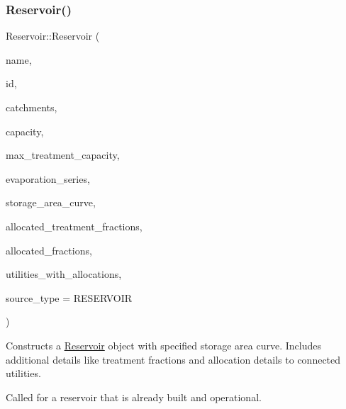 \subsubsection{\texorpdfstring{Reservoir()}{Reservoir()}\hspace{0.1cm}{\footnotesize\ttfamily [5/9]}}
{\footnotesize\ttfamily Reservoir\+::\+Reservoir (\begin{DoxyParamCaption}\item[{const char $\ast$}]{name,  }\item[{const int}]{id,  }\item[{const vector$<$ \mbox{\hyperlink{classCatchment}{Catchment}} $\ast$$>$ \&}]{catchments,  }\item[{const double}]{capacity,  }\item[{const double}]{max\+\_\+treatment\+\_\+capacity,  }\item[{Evaporation\+Series \&}]{evaporation\+\_\+series,  }\item[{Data\+Series $\ast$}]{storage\+\_\+area\+\_\+curve,  }\item[{vector$<$ double $>$ $\ast$}]{allocated\+\_\+treatment\+\_\+fractions,  }\item[{vector$<$ double $>$ $\ast$}]{allocated\+\_\+fractions,  }\item[{vector$<$ int $>$ $\ast$}]{utilities\+\_\+with\+\_\+allocations,  }\item[{int}]{source\+\_\+type = {\ttfamily RESERVOIR} }\end{DoxyParamCaption})}



Constructs a \mbox{\hyperlink{classReservoir}{Reservoir}} object with specified storage area curve. Includes additional details like treatment fractions and allocation details to connected utilities. 

Called for a reservoir that is already built and operational.



